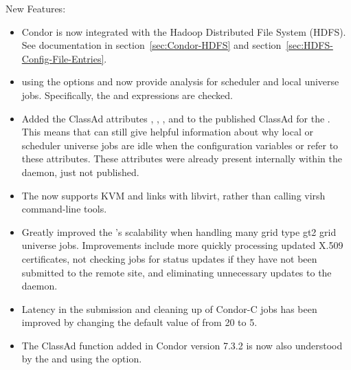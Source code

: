 \noindent New Features:

\begin{itemize}

\item Condor is now integrated with the Hadoop Distributed File System (HDFS). 
See documentation in section~\ref{sec:Condor-HDFS} and 
section~\ref{sec:HDFS-Config-File-Entries}.

\item {} using the options  and 
  now provide analysis for scheduler and local universe jobs.
  Specifically, the  and
   expressions are checked.

\item Added the ClassAd attributes
, ,
, and 
to the published ClassAd for the .  This means that
  can still give helpful information about
why local or scheduler universe jobs are idle when
the configuration variables  or
 refer to these attributes.
These attributes were already present internally within 
the  daemon, 
just not published.

\item The  now supports KVM and links with libvirt, rather 
than calling virsh command-line tools.

\item Greatly improved the 's scalability when handling
many grid type gt2 grid universe jobs.  Improvements include more quickly
processing updated X.509 certificates, not checking jobs for status updates if 
they have not been submitted to the remote site, and eliminating unnecessary 
updates to the  daemon.

\item Latency in the submission and cleaning up of Condor-C jobs
has been improved by changing the default value of
 from 20 to 5.

\item The  ClassAd function added in Condor version 7.3.2
is now also understood by the  and
 using the  option.


\end{itemize}
